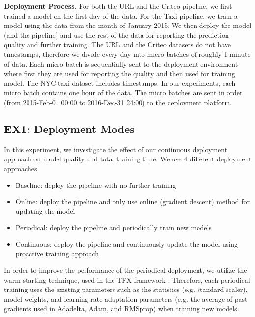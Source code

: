 \textbf{Deployment Process. }
For both the URL and the Criteo pipeline, we first trained a model on the first day of the data.
For the Taxi pipeline, we train a model using the data from the month of January 2015.
We then deploy the model (and the pipeline) and use the rest of the data for reporting the prediction quality and further training.
The URL and the Criteo datasets do not have timestamps, therefore we divide every day into micro batches of roughly 1 minute of data. 
Each micro batch is sequentially sent to the deployment environment where first they are used for reporting the quality and then used for training model.
The NYC taxi dataset includes timestamps. 
In our experiments, each micro batch contains one hour of the data. 
The micro batches are sent in order (from 2015-Feb-01  00:00 to 2016-Dec-31 24:00) to the deployment platform.


\subsection{EX1: Deployment Modes}
In this experiment, we investigate the effect of our continuous deployment approach on model quality and total training time.
We use 4 different deployment approaches.
\begin{itemize}
\item Baseline: deploy the pipeline with no further training
\item Online: deploy the pipeline and only use online (gradient descent) method for updating the model
\item Periodical: deploy the pipeline and periodically train new models 
\item Continuous: deploy the pipeline and continuously update the model using proactive training approach
\end{itemize}

In order to improve the performance of the periodical deployment, we utilize the warm starting technique, used in the TFX framework \cite{baylor2017tfx}.
Therefore, each periodical training uses the existing parameters such as the statistics (e.g. standard scaler), model weights, and learning rate adaptation parameters (e.g. the average of past gradients used in Adadelta, Adam, and RMSprop) when training new models.

